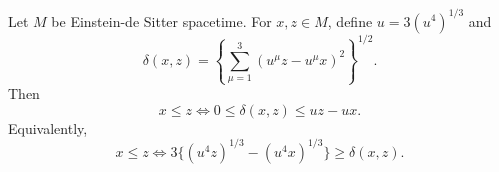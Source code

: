 Let $M$ be Einstein-de Sitter spacetime. For $x, z \in M$, define $u = 3(u^4)^{1/3}$ and
$$
\delta(x, z) = \left\{ \sum_{\mu=1}^{3} (u^\mu z - u^\mu x)^2 \right\}^{1/2}.
$$
Then
$$
x \leq z \iff 0 \leq \delta(x, z) \leq u z - u x.
$$
Equivalently,
$$
x \leq z \iff 3\big\{ (u^4 z)^{1/3} - (u^4 x)^{1/3} \big\} \geq \delta(x, z).
$$
